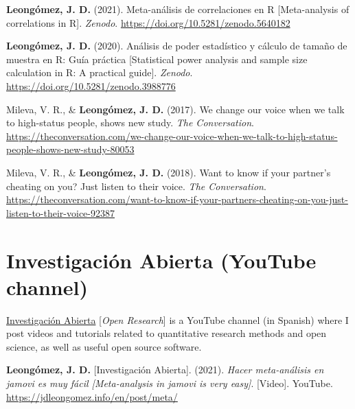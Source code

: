 \documentclass[11pt,a4paper,]{awesome-cv}
\begin{document}
\hypertarget{refs_divulgation}{}
\leavevmode{}%
\textbf{Leongómez, J. D.} (2021). {Meta-análisis de correlaciones en R
{[}Meta-analysis of correlations in R{]}}. \emph{Zenodo}.
\url{https://doi.org/10.5281/zenodo.5640182}

\leavevmode{}%
\textbf{Leongómez, J. D.} (2020). {Análisis de poder estadístico y
cálculo de tamaño de muestra en R: Guía práctica {[}Statistical power
analysis and sample size calculation in R: A practical guide{]}}.
\emph{Zenodo}. \url{https://doi.org/10.5281/zenodo.3988776}

\leavevmode{}%
Mileva, V. R., \& \textbf{Leongómez, J. D.} (2017). {We change our voice
when we talk to high-status people, shows new study}. \emph{The
Conversation}.
\url{https://theconversation.com/we-change-our-voice-when-we-talk-to-high-status-people-shows-new-study-80053}

\leavevmode{}%
Mileva, V. R., \& \textbf{Leongómez, J. D.} (2018). {Want to know if
your partner's cheating on you? Just listen to their voice}. \emph{The
Conversation}.
\url{https://theconversation.com/want-to-know-if-your-partners-cheating-on-you-just-listen-to-their-voice-92387}

\endgroup

\hypertarget{investigaciuxf3n-abierta-youtube-channel}{%
\section{Investigación Abierta (YouTube
channel)}\label{investigaciuxf3n-abierta-youtube-channel}}

\href{https://www.youtube.com/c/InvestigaciónAbierta}{\textcolor{red}{\faYoutubePlay}
Investigación Abierta} {[}\textit{Open Research}{]} is a YouTube channel
(in Spanish) where I post videos and tutorials related to quantitative
research methods and open science, as well as useful open source
software.

\begingroup
\setlength{\parindent}{-0.5in}
\setlength{\leftskip}{0.5in}

\hypertarget{refs_IA}{}
\leavevmode{}%
\textbf{Leongómez, J. D.} {[}Investigación Abierta{]}. (2021).
\emph{{Hacer meta-análisis en jamovi es muy fácil {[}Meta-analysis in
jamovi is very easy{]}}}. {[}Video{]}. YouTube.
\url{https://jdleongomez.info/en/post/meta/}
\end{document}
